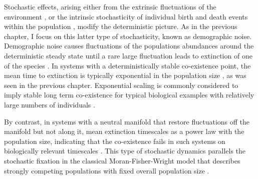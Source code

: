 Stochastic effects, arising either from the extrinsic fluctuations of the environment \cite{Kamenev2008a,Chotibut2017b}, or the intrinsic stochasticity of individual birth and death events within the population \cite{Assaf2006,Gottesman2012,Dobrinevski2012,Gabel2013,Fisher2014,Constable2015,Lin2012,Chotibut2015,Young2018}, modify the deterministic picture. 
As in the previous chapter, I focus on this latter type of stochasticity, known as demographic noise. 
Demographic noise causes fluctuations of the populations abundances around the deterministic steady state until a rare large fluctuation leads to extinction of one of the species \cite{Kimura1968,Lin2012,Chotibut2015}. 
In systems with a deterministically stable co-existence point, the mean time to extinction is typically exponential in the population size \cite{Norden1982,Kamenev2008,Assaf2010,Ovaskainen2010}, as was seen in the previous chapter. 
Exponential scaling is commonly considered to imply stable long term co-existence for typical biological examples with relatively large numbers of individuals \cite{Ovaskainen2010,Lin2015}. 

By contrast, in systems with a neutral manifold that restore fluctuations off the manifold but not along it, mean extinction timescales as a power law with the population size, indicating that the co-existence fails in such systems on biologically relevant timescales \cite{Kimura1955,Moran1962,Lin2012,Chotibut2017a}. 
This type of stochastic dynamics parallels the stochastic fixation in the classical Moran-Fisher-Wright model that describes strongly competing populations with fixed overall population size \cite{Wright1931,Fisher1930,Moran1962,Kimura1968,Rice2004,Rogers2014,Stirk2010,Capitan2017}.

